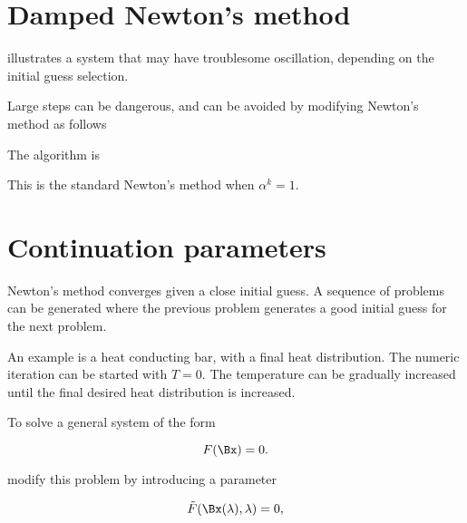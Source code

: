 \section{Damped Newton's method}

 illustrates a system that may have troublesome oscillation, depending on the initial guess selection.



Large steps can be dangerous, and can be avoided by modifying Newton's method as follows

The algorithm is

This is the standard Newton's method when \( \alpha^k = 1 \).

\section{Continuation parameters}

Newton's method converges given a close initial guess.  A sequence of problems can be generated where the previous problem generates a good initial guess for the next problem.

An example is a heat conducting bar, with a final heat distribution.  The numeric iteration can be started with \( T = 0 \).  The temperature can be gradually increased until the final desired heat distribution is increased.

To solve a general system of the form

\begin{equation}\label{eqn:multiphysicsL12:340}
F(\Bx) = 0.
\end{equation}

modify this problem by introducing a parameter

\begin{equation}\label{eqn:multiphysicsL12:360}
\tilde{F}(\Bx(\lambda), \lambda) = 0,
\end{equation}

